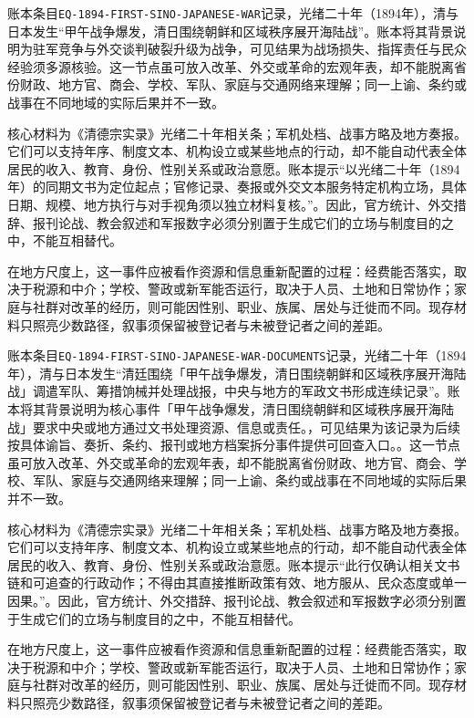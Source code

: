 账本条目\texttt{EQ-1894-FIRST-SINO-JAPANESE-WAR}记录，光绪二十年（1894年），清与日本发生“甲午战争爆发，清日围绕朝鲜和区域秩序展开海陆战”。账本将其背景说明为驻军竞争与外交谈判破裂升级为战争，可见结果为战场损失、指挥责任与民众经验须多源核验。这一节点虽可放入改革、外交或革命的宏观年表，却不能脱离省份财政、地方官、商会、学校、军队、家庭与交通网络来理解；同一上谕、条约或战事在不同地域的实际后果并不一致。

核心材料为《清德宗实录》光绪二十年相关条；军机处档、战事方略及地方奏报。它们可以支持年序、制度文本、机构设立或某些地点的行动，却不能自动代表全体居民的收入、教育、身份、性别关系或政治意愿。账本提示“以光绪二十年（1894年）的同期文书为定位起点；官修记录、奏报或外交文本服务特定机构立场，具体日期、规模、地方执行与对手视角须以独立材料复核。”。因此，官方统计、外交措辞、报刊论战、教会叙述和军报数字必须分别置于生成它们的立场与制度目的之中，不能互相替代。

在地方尺度上，这一事件应被看作资源和信息重新配置的过程：经费能否落实，取决于税源和中介；学校、警政或新军能否运行，取决于人员、土地和日常协作；家庭与社群对改革的经历，则可能因性别、职业、族属、居处与迁徙而不同。现存材料只照亮少数路径，叙事须保留被登记者与未被登记者之间的差距。

账本条目\texttt{EQ-1894-FIRST-SINO-JAPANESE-WAR-DOCUMENTS}记录，光绪二十年（1894年），清与日本发生“清廷围绕「甲午战争爆发，清日围绕朝鲜和区域秩序展开海陆战」调遣军队、筹措饷械并处理战报，中央与地方的军政文书形成连续记录”。账本将其背景说明为核心事件「甲午战争爆发，清日围绕朝鲜和区域秩序展开海陆战」要求中央或地方通过文书处理资源、信息或责任。，可见结果为该记录为后续按具体谕旨、奏折、条约、报刊或地方档案拆分事件提供可回查入口。。这一节点虽可放入改革、外交或革命的宏观年表，却不能脱离省份财政、地方官、商会、学校、军队、家庭与交通网络来理解；同一上谕、条约或战事在不同地域的实际后果并不一致。

核心材料为《清德宗实录》光绪二十年相关条；军机处档、战事方略及地方奏报。它们可以支持年序、制度文本、机构设立或某些地点的行动，却不能自动代表全体居民的收入、教育、身份、性别关系或政治意愿。账本提示“此行仅确认相关文书链和可追查的行政动作；不得由其直接推断政策有效、地方服从、民众态度或单一因果。”。因此，官方统计、外交措辞、报刊论战、教会叙述和军报数字必须分别置于生成它们的立场与制度目的之中，不能互相替代。

在地方尺度上，这一事件应被看作资源和信息重新配置的过程：经费能否落实，取决于税源和中介；学校、警政或新军能否运行，取决于人员、土地和日常协作；家庭与社群对改革的经历，则可能因性别、职业、族属、居处与迁徙而不同。现存材料只照亮少数路径，叙事须保留被登记者与未被登记者之间的差距。

